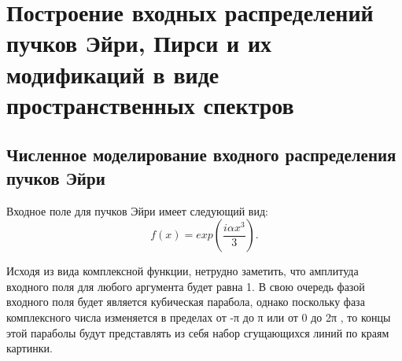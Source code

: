     \section[Построение входных распределений пучков Эйри, Пирси и их модификаций в виде пространственных спектров]{\nohyphens{Построение входных распределений пучков Эйри, Пирси и их модификаций в виде пространственных спектров}}{

    \subsection[Численное моделирование входного распределения пучков Эйри]{\nohyphens{Численное моделирование входного распределения пучков Эйри}}
    Входное поле для пучков Эйри имеет следующий вид:
    \begin{equation*}
        \label{}
        f(x) = exp(\frac{i \alpha x^3}{3}).
    \end{equation*}

    Исходя из вида комплексной функции, нетрудно заметить, что амплитуда
    входного поля для любого аргумента будет равна 1. В свою очередь фазой
    входного поля будет является кубическая парабола, однако поскольку фаза
    комплексного числа изменяется в пределах от -π до π или от 0 до 2π , то концы
    этой параболы будут представлять из себя набор сгущающихся линий по краям
    картинки.

}
